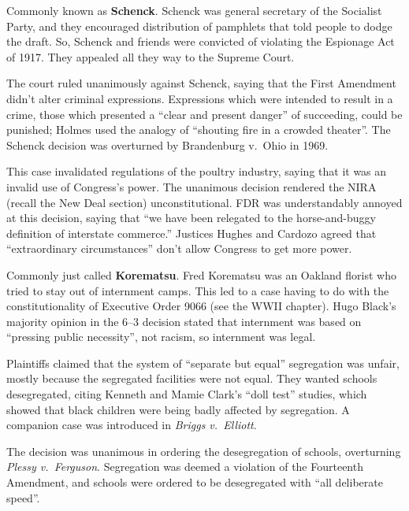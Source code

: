 
Commonly known as \textbf{Schenck}.
Schenck was general secretary of the Socialist Party,
and they encouraged distribution of pamphlets that told people to dodge the draft.
So, Schenck and friends were convicted of violating the Espionage Act of 1917.
They appealed all they way to the Supreme Court.

The court ruled unanimously against Schenck, saying that the First Amendment didn't alter criminal expressions.
Expressions which were intended to result in a crime,
those which presented a ``clear and present danger'' of succeeding, could be punished;
Holmes used the analogy of ``shouting fire in a crowded theater''.
The Schenck decision was overturned by Brandenburg v.\ Ohio in 1969.


This case invalidated regulations of the poultry industry, saying that it was an invalid use of Congress's power.
The unanimous decision rendered the NIRA (recall the New Deal section) unconstitutional.
FDR was understandably annoyed at this decision,
saying that ``we have been relegated to the horse-and-buggy definition of interstate commerce.''
Justices Hughes and Cardozo agreed that ``extraordinary circumstances'' don't allow Congress to get more power.


Commonly just called \textbf{Korematsu}.
Fred Korematsu was an Oakland florist who tried to stay out of internment camps.
This led to a case having to do with the constitutionality of Executive Order 9066 (see the WWII chapter).
Hugo Black's majority opinion in the 6--3 decision stated that internment was based
on ``pressing public necessity'', not racism, so internment was legal.


Plaintiffs claimed that the system of ``separate but equal'' segregation was unfair,
mostly because the segregated facilities were not equal.
They wanted schools desegregated,
citing Kenneth and Mamie Clark's ``doll test'' studies,
which showed that black children were being badly affected by segregation.
A companion case was introduced in \textit{Briggs v.\ Elliott}.

The decision was unanimous in ordering the desegregation of schools, overturning \textit{Plessy v.\ Ferguson}.
Segregation was deemed a violation of the Fourteenth Amendment,
and schools were ordered to be desegregated with ``all deliberate speed''.

